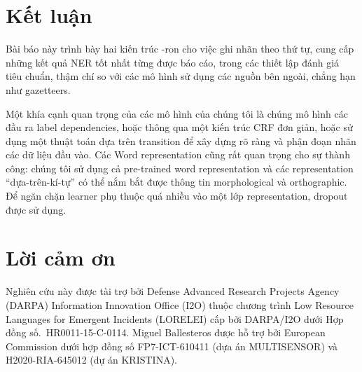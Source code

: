 \documentclass[11pt,letterpaper]{article}
\begin{document}
\section{Kết luận}

Bài báo này trình bày hai kiến trúc -ron cho việc ghi nhãn theo thứ tự, cung cấp  những kết quả NER tốt nhất từng được báo cáo, trong các thiết lập đánh giá tiêu chuẩn, thậm chí so với các mô hình sử dụng các nguồn bên ngoài, chẳng hạn như gazetteers.

Một khía cạnh quan trọng của các mô hình của chúng tôi là chúng mô hình các đầu ra label dependencies, hoặc thông qua một kiến trúc CRF đơn giản, hoặc sử dụng một thuật toán dựa trên transition để xây dựng rõ ràng và phận đoạn nhãn các dữ liệu đầu vào. Các Word representation cũng rất quan trọng cho sự thành công: chúng tôi sử dụng cả pre-trained word representation và các representation ``dựa-trên-kí-tự'' có thể nắm bắt được thông tin morphological và orthographic. Để ngăn chặn learner phụ thuộc quá nhiều vào một lớp representation, dropout được sử dụng.

\section*{Lời cảm ơn}

Nghiên cứu này được tài trợ bởi Defense Advanced Research Projects Agency (DARPA)
Information Innovation Office (I2O) thuộc chương trình Low Resource Languages for Emergent Incidents (LORELEI) cấp bởi DARPA/I2O dưới Hợp đồng số.~HR0011-15-C-0114. Miguel Ballesteros được hỗ trợ bởi European Commission dưới hợp đồng số FP7-ICT-610411 (dựa án MULTISENSOR) và H2020-RIA-645012 (dự án KRISTINA).
\end{document}
